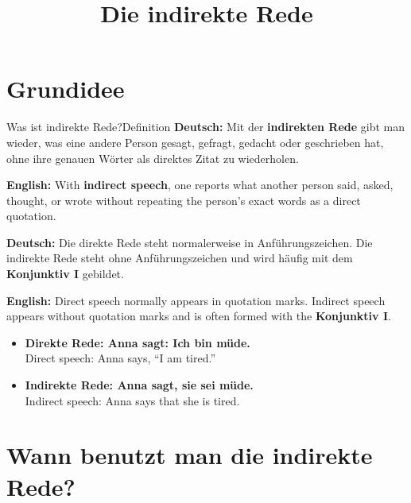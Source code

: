 \documentclass[a4paper,11pt]{article}
\title{Die indirekte Rede}
\date{}
\newcommand{\GermanText}[1]{\textbf{Deutsch: }#1\par}
\newcommand{\EnglishText}[1]{{\small\color{SoftGray}\textbf{English: }#1\par}}
\newcommand{\ExampleItem}[2]{\item \textbf{#1}\\{\small\color{SoftGray}#2}}
\begin{document}
    \maketitle
    \tableofcontents
    \newpage

    \section{Grundidee}

        \begin{grammarentry}{Was ist indirekte Rede?}{Definition}
            \GermanText{Mit der \textbf{indirekten Rede} gibt man wieder, was eine andere Person gesagt, gefragt, gedacht oder geschrieben hat, ohne ihre genauen Wörter als direktes Zitat zu wiederholen.}
            \EnglishText{With \textbf{indirect speech}, one reports what another person said, asked, thought, or wrote without repeating the person's exact words as a direct quotation.}

            \GermanText{Die direkte Rede steht normalerweise in Anführungszeichen. Die indirekte Rede steht ohne Anführungszeichen und wird häufig mit dem \textbf{Konjunktiv I} gebildet.}
            \EnglishText{Direct speech normally appears in quotation marks. Indirect speech appears without quotation marks and is often formed with the \textbf{Konjunktiv I}.}
        \end{grammarentry}

        \begin{exbox}
            \begin{itemize}
                \ExampleItem{Direkte Rede: Anna sagt: \glqq Ich bin müde.\grqq}{Direct speech: Anna says, ``I am tired.''}
                \ExampleItem{Indirekte Rede: Anna sagt, sie sei müde.}{Indirect speech: Anna says that she is tired.}
            \end{itemize}
        \end{exbox}


    \section{Wann benutzt man die indirekte Rede?}
\end{document}
